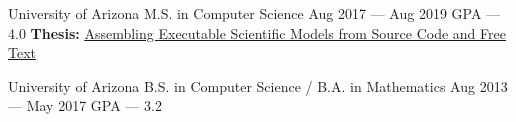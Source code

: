 

\begin{cventries}

  \cventry
    {University of Arizona} %
    {M.S. in Computer Science} %
    {Aug 2017 --- Aug 2019} %
    {GPA --- 4.0} %
    {\textbf{Thesis:} \href{https://repository.arizona.edu/handle/10150/634301}{\underline{Assembling Executable Scientific Models from Source Code and Free Text}}}

    \cventry
      {University of Arizona} %
      {B.S. in Computer Science / B.A. in Mathematics} %
      {Aug 2013 --- May 2017} %
      {GPA --- 3.2} %
      {}
    \vspace{-1cm}
\end{cventries}
